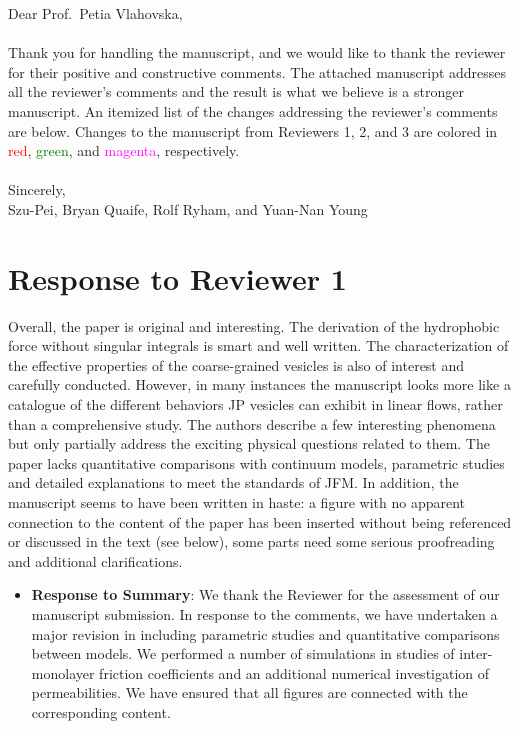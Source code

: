 \documentclass[11pt]{article}
\newcommand{\comment}[1]{{\color{blue} #1}}
\begin{document}
\noindent
Dear Prof.~Petia Vlahovska,
\\ \\
\noindent
Thank you for handling the manuscript, and we would like to thank the
reviewer for their positive and constructive comments. The attached
manuscript addresses all the reviewer's comments and the result is what
we believe is a stronger manuscript. An itemized list of the changes
addressing the reviewer's comments are below. Changes to the manuscript
from Reviewers 1, 2, and 3 are colored in \textcolor{red}{red},
\textcolor{green}{green}, and \textcolor{magenta}{magenta},
respectively. \\ \\
\noindent
Sincerely,
\\
\noindent
Szu-Pei, Bryan Quaife, Rolf Ryham, and Yuan-Nan Young

\section*{Response to Reviewer 1}
\noindent
\comment{Overall, the paper is original and interesting. The derivation
of the hydrophobic force without singular integrals is smart and well
written. The characterization of the effective properties of the
coarse-grained vesicles is also of interest and carefully conducted.
However, in many instances the manuscript looks more like a catalogue of
the different behaviors JP vesicles can exhibit in linear flows, rather
than a comprehensive study. The authors describe a few interesting
phenomena but only partially address the exciting physical questions
related to them. The paper lacks quantitative comparisons with continuum
models, parametric studies and detailed explanations to meet the
standards of JFM. In addition, the manuscript seems to have been written
in haste: a figure with no apparent connection to the content of the
paper has been inserted without being referenced or discussed in the
text (see below), some parts need some serious proofreading and
additional clarifications.}
\begin{itemize}
  \item {\bf Response to Summary}: 	We thank the Reviewer for the assessment of our manuscript submission. In response
to the comments, we have undertaken a major revision in including parametric studies and quantitative comparisons between models. We performed a number of simulations 
in studies of inter-monolayer friction coefficients and an additional numerical investigation 
of permeabilities. We have ensured that all figures are connected with the corresponding content. 
  \begin{quotation}
  \end{quotation}
\end{itemize}
\end{document}

